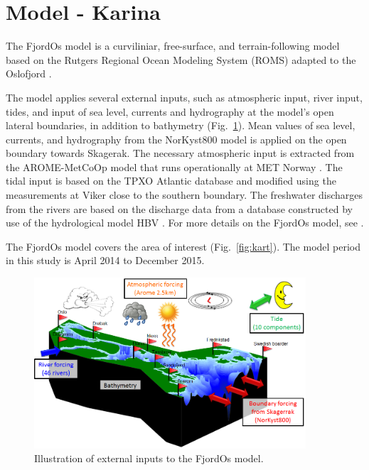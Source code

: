 \documentclass[12pt,a4paper,english]{article}
\begin{document}
\newpage
\section{Model - Karina}

The FjordOs model is a curviliniar, free-surface, and terrain-following model based on the Rutgers Regional Ocean Modeling System (ROMS) \citep{haidv:etal:2008,shche:mcwil:2003,shche:mcwil:2005,shche:mcwil:2009} adapted to the Oslofjord \citep{roed:etal:2016}. 

The model applies several external inputs, such as atmospheric input, river input, tides, and input of sea level, currents and hydrography at the model's open lateral boundaries, in addition to bathymetry (Fig.~\ref{fig:oppbygging}). Mean values of sea level, currents, and hydrography from the NorKyst800 model \citep{albre:etal:2011} is applied on the open boundary towards Skagerak. The necessary atmospheric input is extracted from the AROME-MetCoOp model that runs operationally at MET Norway \citep{mulle:etal:2015}. The tidal input is based on the TPXO Atlantic database \citep{egber:erofe:2002} and modified using the measurements at Viker close to the southern boundary. The freshwater discharges from the rivers are based on the discharge data from a database constructed by use of the hydrological model HBV \citep{beldr:etal:2003}. For more details on the FjordOs model, see \cite{roed:etal:2016}.

The FjordOs model covers the area of interest (Fig.~\ref{fig:kart}). The model period in this study is April 2014 to December 2015.

\begin{figure}[htb]
\centerline{
\includegraphics*[width=0.9\textwidth]{Figurer/oppbygging}
}
\caption{\small
Illustration of external inputs to the FjordOs model.
}
\label{fig:oppbygging}
\end{figure}
\end{document}
